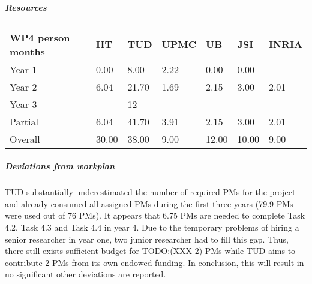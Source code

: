 
\subparagraph{Resources}

\begin{center}
\begin{tabular}{|C{1.5cm}|C{1.5cm}|C{1.5cm}|C{2cm}|C{2cm}|C{2cm}|C{2cm}|}
\hline
\footnotesize \textbf{WP4 person months}& \footnotesize \textbf{IIT}&\footnotesize \textbf{TUD}&\footnotesize \textbf{UPMC}& \footnotesize \textbf{UB} &\footnotesize \textbf{JSI} &\footnotesize \textbf{INRIA}\\ \hline
\footnotesize Year 1 &  0.00 & 8.00 & 2.22 & 0.00 & 0.00 & -     \\  \hline
\footnotesize Year 2 &  6.04 & 21.70 & 1.69 & 2.15 & 3.00 & 2.01     \\  \hline
\footnotesize Year 3 &  -    & 12    & -    & -    & -    & -     \\  \hline
\footnotesize Partial &  6.04 & 41.70 & 3.91 & 2.15 & 3.00 & 2.01 \\ \hline \hline
\footnotesize Overall &  30.00 & 38.00 & 9.00 & 12.00 & 10.00 & 9.00 \\ \hline
\end{tabular}
\end{center}

\subparagraph{Deviations from workplan} 
TUD substantially underestimated the number of required PMs for the project and already consumed all assigned PMs during the first three years (79.9 PMs were used out of 76 PMs). It appears that 6.75 PMs are needed to complete Task 4.2, Task 4.3 and Task 4.4 in year 4. Due to the temporary problems of hiring a senior researcher in year one, two junior researcher had to fill this gap. Thus, there still exists sufficient budget for TODO:(XXX-2) PMs while TUD aims to contribute 2 PMs from its own endowed funding. In conclusion, this will result in no significant other deviations are reported.

